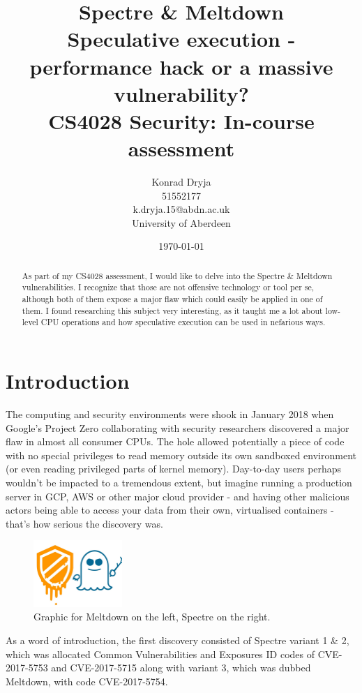 \documentclass{article}
\title{Spectre \& Meltdown \\
\large{Speculative execution - performance hack or a massive vulnerability? \\ CS4028 Security: In-course assessment}}
\author{Konrad Dryja \\ 51552177 \\ k.dryja.15@abdn.ac.uk \\ University of Aberdeen}
\date{\today}
\begin{document}
 
\maketitle
 
\tableofcontents

\begin{abstract}
  As part of my CS4028 assessment, I would like to delve into the Spectre \& Meltdown vulnerabilities. I recognize that those are not offensive technology or tool per se, although both of them expose a major flaw which could easily be applied in one of them. I found researching this subject very interesting, as it taught me a lot about low-level CPU operations and how speculative execution can be used in nefarious ways. 
\end{abstract}
 
\section{Introduction}
 
The computing and security environments were shook in January 2018 when Google's Project Zero collaborating with security researchers discovered a major flaw in almost all consumer CPUs. The hole allowed potentially a piece of code with no special privileges to read memory outside its own sandboxed environment (or even reading privileged parts of kernel memory). Day-to-day users perhaps wouldn't be impacted to a tremendous extent, but imagine running a production server in GCP, AWS or other major cloud provider - and having other malicious actors being able to access your data from their own, virtualised containers - that's how serious the discovery was. 

\begin{figure}[h]
\centering
\includegraphics[width=0.3\textwidth]{logo}
  \caption{Graphic for Meltdown on the left, Spectre on the right.}
\end{figure}

As a word of introduction, the first discovery consisted of Spectre variant 1 \& 2, which was allocated Common Vulnerabilities and Exposures ID codes of CVE-2017-5753 and CVE-2017-5715 along with variant 3, which was dubbed Meltdown, with code CVE-2017-5754.
 
\end{document}
